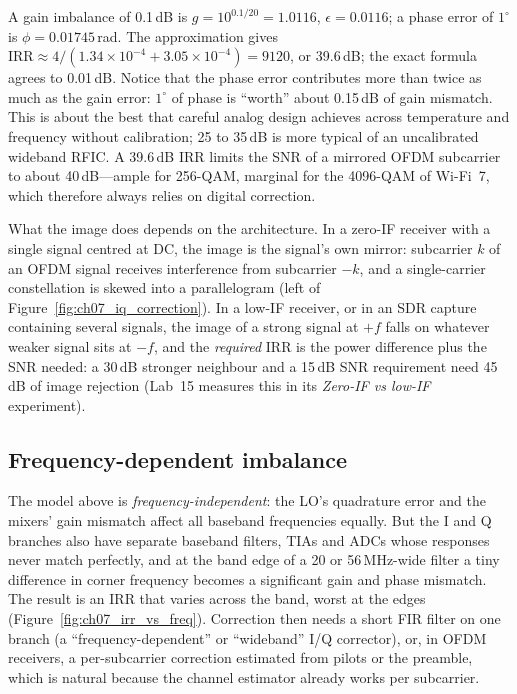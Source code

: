 \begin{worked}
A gain imbalance of 0.1\,dB is $g=10^{0.1/20}=1.0116$, $\epsilon=0.0116$; a phase error of $1^\circ$
is $\phi=0.01745$\,rad. The approximation gives $\text{IRR}\approx4/(1.34\times10^{-4}+3.05\times10^{-4})
=9120$, or 39.6\,dB; the exact formula agrees to 0.01\,dB. Notice that the phase error contributes more
than twice as much as the gain error: $1^\circ$ of phase is ``worth'' about 0.15\,dB of gain mismatch. This
is about the best that careful analog design achieves across temperature and frequency without
calibration; 25 to 35\,dB is more typical of an uncalibrated wideband RFIC. A 39.6\,dB IRR limits the
SNR of a mirrored OFDM subcarrier to about 40\,dB---ample for 256-QAM, marginal for the 4096-QAM of Wi-Fi~7,
which therefore always relies on digital correction.
\end{worked}


What the image does depends on the architecture. In a zero-IF receiver with a single signal centred at
DC, the image is the signal's own mirror: subcarrier $k$ of an OFDM signal receives interference from
subcarrier $-k$, and a single-carrier constellation is skewed into a parallelogram (left of
Figure~\ref{fig:ch07_iq_correction}). In a low-IF receiver, or in an SDR capture containing several
signals, the image of a strong signal at $+f$ falls on whatever weaker signal sits at $-f$, and the
\emph{required} IRR is the power difference plus the SNR needed: a 30\,dB stronger neighbour and a 15\,dB
SNR requirement need 45\,dB of image rejection (Lab~15 measures this in its \emph{Zero-IF vs low-IF}
experiment).

\subsection{Frequency-dependent imbalance}

The model above is \emph{frequency-independent}: the LO's quadrature error and the mixers' gain
mismatch affect all baseband frequencies equally. But the I and Q branches also have separate
baseband filters, TIAs and ADCs whose responses never match perfectly, and at the band edge of a 20 or
56\,MHz-wide filter a tiny difference in corner frequency becomes a significant gain and phase mismatch.
The result is an IRR that varies across the band, worst at the edges
(Figure~\ref{fig:ch07_irr_vs_freq}). Correction then needs a short FIR
filter on one branch (a ``frequency-dependent'' or ``wideband'' I/Q corrector), or, in OFDM receivers,
a per-subcarrier correction estimated from pilots or the preamble, which is natural because the
channel estimator already works per subcarrier.

